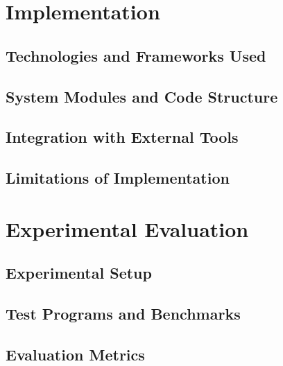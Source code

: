 \documentclass[conference]{IEEEtran}
\begin{document}
\section{Implementation}

\subsection{Technologies and Frameworks Used}

\subsection{System Modules and Code Structure}

\subsection{Integration with External Tools}

\subsection{Limitations of Implementation}

\section{Experimental Evaluation}

\subsection{Experimental Setup}

\subsection{Test Programs and Benchmarks}

\subsection{Evaluation Metrics}
\end{document}
